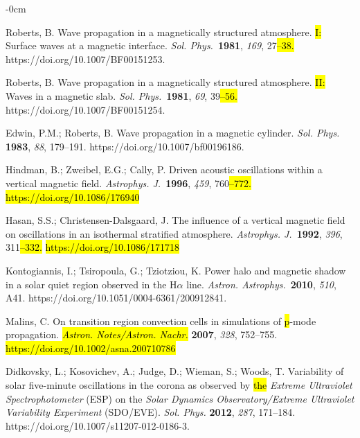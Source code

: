 \documentclass[physics,article,accept,pdftex,moreauthors]{Definitions/mdpi}
\newcommand{\aap}{{\it Astron. Astrophys.}}
\newcommand{\apj}{{\it Astrophys. J.}}
\newcommand{\solphys}{{\it Sol. Phys.}}
\begin{document}
\begin{adjustwidth}{-\extralength}{0cm}
\begin{thebibliography}{999}
{		
		
		 Roberts, B. {Wave propagation in a magnetically structured atmosphere. 
 \hl{I:} %
 Surface waves at a magnetic interface}. \solphys~\textbf{1981}, \emph{169}, 
27\hl{--38.} https://doi.org/10.1007/BF00151253.
		
		 Roberts, B. {Wave propagation in a magnetically structured atmosphere. 
 \hl{II:} 
 Waves in a magnetic slab}. \solphys~\textbf{1981}, \emph{69}, 39\hl{--56.} https://doi.org/10.1007/BF00151254.
		
		
		 Edwin, P.M.; Roberts, B. Wave propagation in a magnetic cylinder. \emph{Sol. Phys.} \textbf{1983}, \emph{88}, 179--191. https://doi.org/10.1007/bf00196186.
		
		
		Hindman, B.; Zweibel, E.G.; Cally, P. Driven acoustic oscillations within a vertical magnetic field. \apj~\textbf{1996}, \emph{459}, 
760\hl{--772.} \hl{https://doi.org/10.1086/176940} 
		
		 Hasan, S.S.; Christensen-Dalsgaard, J. The influence of a 
vertical magnetic field on oscillations in an isothermal stratified atmosphere. \apj~\textbf{1992}, \emph{396}, 311\hl{--332.} 
\hl{https://doi.org/10.1086/171718} 

		Kontogiannis, I.; Tsiropoula, G.; Tziotziou, K. Power halo and magnetic shadow in a solar quiet region observed in the H$\alpha$
 line. \aap~\textbf{2010}, \emph{510}, A41. https://doi.org/10.1051/0004-6361/200912841.
		
		{Malins}, C. {On transition region convection cells in simulations of
 \hl{p}-mode propagation}. \emph{\hl{Astron. Notes/Astron. Nachr.}} \textbf{2007}, \emph{328}, 752--755.
\hl{https://doi.org/10.1002/asna.200710786}		

		 Didkovsky, L.; Kosovichev, A.; Judge, D.; Wieman, S.; Woods, T. 
Variability of solar five-minute oscillations in the corona as observed by \hl{the} 
 \emph{Extreme Ultraviolet Spectrophotometer} %
(ESP) on the 
\emph{Solar 
Dynamics Observatory/Extreme Ultraviolet Variability Experiment} (SDO/EVE). \emph{Sol. Phys.} \textbf{2012}, \emph{287}, 171--184. 
https://doi.org/10.1007/s11207-012-0186-3.
		
}
\end{thebibliography}
\end{adjustwidth}
\end{document}
